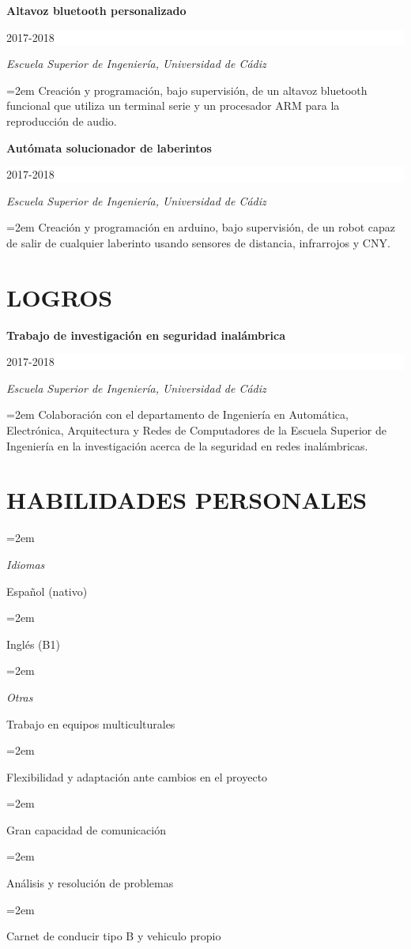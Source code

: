 \documentclass[paper=a4,fontsize=11pt]{scrartcl}
\newlength{\spacebox}
\newcommand{\NewPart}[1]{\section*{\uppercase{#1}}}
\newcommand{\PersonalEntry}[2]{
		\noindent\hangindent=2em\hangafter=0 %
		\parbox{\spacebox}{        %
		\textit{#1}}		       %
		\hspace{1.5em} #2 \par}    %
\newcommand{\SkillsEntry}[2]{      %
		\noindent\hangindent=2em\hangafter=0 %
		\parbox{\spacebox}{        %
		\textit{#1}}			   %
		\hspace{1.5em} #2 \par}    %
\newcommand{\EducationEntry}[4]{
		\noindent \textbf{#1} \hfill      %
		\colorbox{White}{%
			\parbox{5cm}{%
			\hfill\color{Black}#2}} \par  %
		\noindent \textit{#3} \par        %
		\noindent\hangindent=2em\hangafter=0 \small #4 %
		\normalsize \par}
\begin{document}
\EducationEntry{Altavoz bluetooth personalizado}{2017-2018}{Escuela Superior de Ingeniería, Universidad de Cádiz}{Creación y programación, bajo supervisión, de un altavoz bluetooth funcional que utiliza un terminal serie y un procesador ARM para la reproducción de audio.\\}

\EducationEntry{Autómata solucionador de laberintos}{2017-2018}{Escuela Superior de Ingeniería, Universidad de Cádiz}{Creación y programación en arduino, bajo supervisión, de un robot capaz de salir de cualquier laberinto usando sensores de distancia, infrarrojos y CNY.}

\NewPart{Logros}
\EducationEntry{Trabajo de investigación en seguridad inalámbrica}{2017-2018}{Escuela Superior de Ingeniería, Universidad de Cádiz}{Colaboración con el departamento de Ingeniería en Automática, Electrónica, Arquitectura y Redes de Computadores de la Escuela Superior de Ingeniería en la investigación acerca de la seguridad en redes inalámbricas.}

\NewPart{Habilidades personales}{}
\SkillsEntry{Idiomas}{Español (nativo)}
\SkillsEntry{}{Inglés (B1)\\}

\SkillsEntry{Otras}{Trabajo en equipos multiculturales}
\SkillsEntry{}{Flexibilidad y adaptación ante cambios en el proyecto}
\SkillsEntry{}{Gran capacidad de comunicación}
\SkillsEntry{}{Análisis y resolución de problemas}
\SkillsEntry{}{Carnet de conducir tipo B y vehiculo propio}




\end{document}
